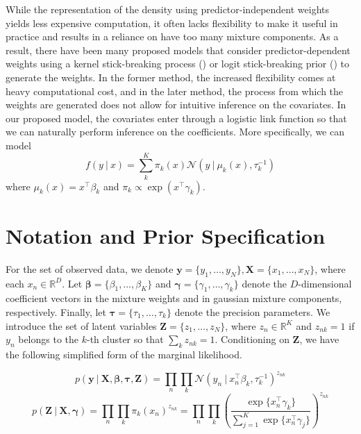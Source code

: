 \documentclass[twoside,11pt]{article}
\newcommand\given[1][]{\:#1\vert\:}
\newcommand{\transpose}[1]{#1^{\intercal}}
\newcommand{\R}{\mathbb{R}}
\newcommand{\nprod}{\prod_{n}}
\newcommand{\kprod}{\prod_{k}}
\newcommand{\boldbeta}{\boldsymbol\beta}
\newcommand{\boldgamma}{\boldsymbol\gamma}
\newcommand{\boldtau}{\boldsymbol\tau}
\newcommand{\sumexp}{\sum_{j=1}^{K} \exp \{ \transpose{x_n} \gamma_j \}}
\begin{document}
While the representation of the density using predictor-independent weights yields less expensive computation, it often lacks flexibility to make it useful in practice and results in a reliance on have too many mixture components. As a result, there have been many proposed models that consider predictor-dependent weights using a kernel stick-breaking process (\cite{dunsonpark:08}) or logit stick-breaking prior (\cite{durante:17}) to generate the weights. In the former method, the increased flexibility comes at heavy computational cost, and in the later method, the process from which the weights are generated does not allow for intuitive inference on the covariates. In our proposed model, the covariates enter through a logistic link function so that we can naturally perform inference on the coefficients. More specifically, we can model
\begin{equation} \label{eq:covdep_gm}
	 f(y \given x) = \sum_{k}^{K} \pi_k(x) \mathcal{N} \left( y \given \mu_k(x), \tau_k^{-1} \right) 
\end{equation} 
where $\mu_k(x) = \transpose{x} \beta_k$ and $\pi_{k} \propto \exp(\transpose{x} \gamma_k)$. 

\section{Notation and Prior Specification}
For the set of observed data, we denote $\mathbf{y} = \{y_1, \ldots, y_N \}, \mathbf{X} = \{ x_1, \ldots, x_N \}$, where each $x_n \in \R^{D}$. Let $\boldbeta = \{ \beta_1, \ldots, \beta_K\}$ and $\boldgamma = \{ \gamma_1, \ldots, \gamma_k\}$ denote the $D$-dimensional coefficient vectors  in the mixture weights and in gaussian mixture components, respectively. Finally, let $\boldtau = \{ \tau_1, \ldots, \tau_k \}$ denote the precision parameters. We introduce the set of latent variables $\mathbf{Z} = \{ z_1, \ldots, z_N \}$, where $z_n \in \R^K$ and $z_{nk} = 1$ if $y_n$ belongs to the $k$-th cluster so that $\sum_{k} z_{nk} = 1$. Conditioning on $\mathbf{Z}$, we have the following simplified form of the marginal likelihood. 


\begin{equation} \label{eq:simp_lik}
	p \left( \mathbf{y} \given \mathbf{X}, \boldsymbol\beta, \boldsymbol{\tau}, \mathbf{Z} \right) = 
	\prod_{n} \prod_{k} \mathcal{N} \left( y_n \given \transpose{x_n} \beta_k, \tau_{k}^{-1} \right)^{z_{nk}}
\end{equation}
\begin{equation} \label{eq:z_prior}
	p \left( \mathbf{Z} \given \mathbf{X}, \boldsymbol\gamma \right) = \nprod \kprod \pi_{k} (x_n)^{z_{nk}} = 
	\nprod \kprod \left( \frac{\exp\{\transpose{x_n} \gamma_k\}}{\sumexp}\right)^{z_{nk}}
\end{equation}
\end{document}
